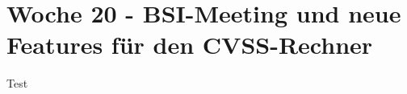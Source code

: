 \section{Woche 20 - BSI-Meeting und neue Features für den CVSS-Rechner} \label{sec:bericht-wo-20}



Test
